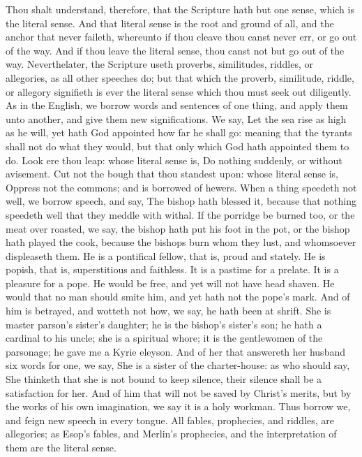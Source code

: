 Thou shalt understand, therefore, that the Scripture hath
but one sense, which is the literal sense. And that literal
sense is the root and ground of all, and the anchor that never
faileth, whereunto if thou cleave thou canst never err, or 
go out of the way. And if thou leave the literal sense, 
thou canst not but go out of the way. Neverthelater, 
the Scripture useth proverbs, similitudes, riddles, or allegories,
as all other speeches do; but that which the proverb,
similitude, riddle, or allegory signifieth is ever the 
literal sense which thou must seek out diligently. As in 
the English, we borrow words and sentences of one thing, 
and apply them unto another, and give them new significations.
We say, Let the sea rise as high as he will, yet 
hath God appointed how far he shall go: meaning that 
the tyrants shall not do what they would, but that only 
which God hath appointed them to do. Look ere thou leap: 
whose literal sense is, Do nothing suddenly, or without 
avisement. Cut not the bough that thou standest upon: 
whose literal sense is, Oppress not the commons; and is 
borrowed of hewers. When a thing speedeth not well, we 
borrow speech, and say, The bishop hath blessed it, because 
that nothing speedeth well that they meddle with withal. 
If the porridge be burned too, or the meat over roasted, 
we say, the bishop hath put his foot in the pot, or the 
bishop hath played the cook, because the bishops burn 
whom they lust, and whomsoever displeaseth them. He is a 
pontifical fellow, that is, proud and stately. He is popish, 
that is, superstitious and faithless. It is a pastime for a 
prelate. It is a pleasure for a pope. He would be free, 
and yet will not have head shaven. He would that no 
man should smite him, and yet hath not the pope's mark. 
And of him is betrayed, and wotteth not how, we say, he 
hath been at shrift. She is master parson's sister's daughter; 
he is the bishop's sister's son; he hath a cardinal to his 
uncle; she is a spiritual whore; it is the gentlewomen of 
the parsonage; he gave me a Kyrie eleyson. And of her 
that answereth her husband six words for one, we say, 
She is a sister of the charter-house: as who should say, 
She thinketh that she is not bound to keep silence, their 
silence shall be a satisfaction for her. And of him that 
will not be saved by Christ's merits, but by the works of 
his own imagination, we say it is a holy workman. Thus 
borrow we, and feign new speech in every tongue. All 
fables, prophecies, and riddles, are allegories; as Esop's 
fables, and Merlin's prophecies, and the interpretation of 
them are the literal sense. 

